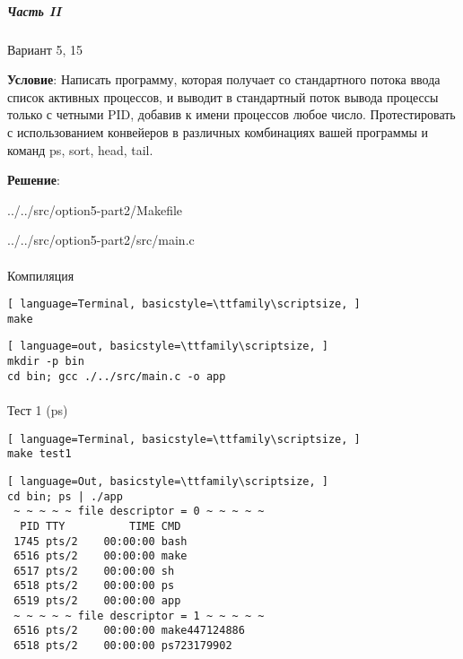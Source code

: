 \subparagraph{Часть II} Вариант 5, 15

\textbf{Условие}:
Написать  программу,  которая  получает  со  стандартного  потока  ввода список активных процессов, и выводит в стандартный поток вывода процессы только с четными PID, добавив к имени процессов любое число. Протестировать с использованием конвейеров в различных комбинациях вашей программы и команд ps, sort, head, tail.

\textbf{Решение}:


{../../src/option5-part2/Makefile}

\newpage


{../../src/option5-part2/src/main.c}

\newpage

\paragraph{}
Компиляция

\begin{lstlisting}[ language=Terminal, basicstyle=\ttfamily\scriptsize, ]
make
\end{lstlisting}

\begin{lstlisting}[ language=out, basicstyle=\ttfamily\scriptsize, ]
mkdir -p bin
cd bin; gcc ./../src/main.c -o app
\end{lstlisting}
    
\paragraph{}
Тест 1 (ps)

\begin{lstlisting}[ language=Terminal, basicstyle=\ttfamily\scriptsize, ]
make test1
\end{lstlisting}

\begin{lstlisting}[ language=Out, basicstyle=\ttfamily\scriptsize, ]
cd bin; ps | ./app
 ~ ~ ~ ~ ~ file descriptor = 0 ~ ~ ~ ~ ~
  PID TTY          TIME CMD
 1745 pts/2    00:00:00 bash
 6516 pts/2    00:00:00 make
 6517 pts/2    00:00:00 sh
 6518 pts/2    00:00:00 ps
 6519 pts/2    00:00:00 app
 ~ ~ ~ ~ ~ file descriptor = 1 ~ ~ ~ ~ ~
 6516 pts/2    00:00:00 make447124886
 6518 pts/2    00:00:00 ps723179902
\end{lstlisting}


